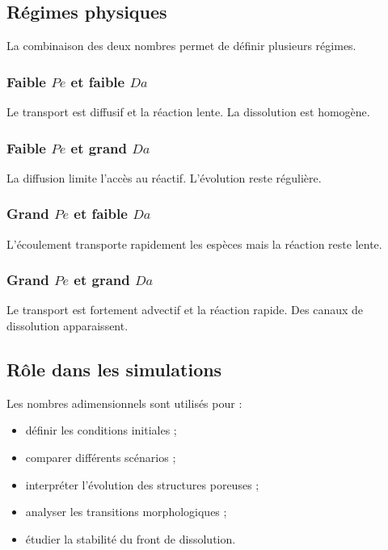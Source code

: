 \documentclass[12pt,a4paper]{report}
\begin{document}
\subsection{Régimes physiques}

La combinaison des deux nombres permet de définir plusieurs régimes.

\subsubsection{Faible $Pe$ et faible $Da$}

Le transport est diffusif et la réaction lente. La dissolution est homogène.

\subsubsection{Faible $Pe$ et grand $Da$}

La diffusion limite l’accès au réactif. L’évolution reste régulière.

\subsubsection{Grand $Pe$ et faible $Da$}

L’écoulement transporte rapidement les espèces mais la réaction reste lente.

\subsubsection{Grand $Pe$ et grand $Da$}

Le transport est fortement advectif et la réaction rapide. Des canaux de dissolution apparaissent.

\subsection{Rôle dans les simulations}

Les nombres adimensionnels sont utilisés pour :

\begin{itemize}
\item définir les conditions initiales ;
\item comparer différents scénarios ;
\item interpréter l’évolution des structures poreuses ;
\item analyser les transitions morphologiques ;
\item étudier la stabilité du front de dissolution.
\end{itemize}
\end{document}
